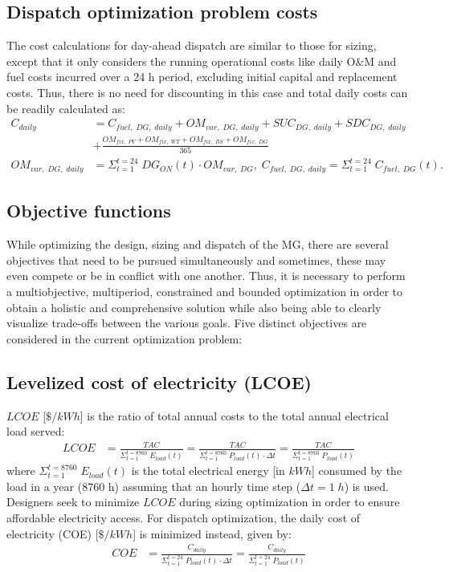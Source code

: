 \documentclass[final,3p,times]{elsarticle}
\begin{document}
\subsection{Dispatch optimization problem costs}

The cost calculations for day-ahead dispatch are similar to those for sizing, except that it only considers the running operational costs like daily O\&M and fuel costs incurred over a 24 h period, excluding initial capital and replacement costs. Thus, there is no need for discounting in this case and total daily costs can be readily calculated as: 
\begin{align*}
    C_{daily} & = C_{fuel,\; DG,\; daily} + OM_{var, \; DG,\; daily} + SUC_{DG,\;daily} + SDC_{DG,\;daily} \\
    & + \frac{OM_{fix,\;PV} + OM_{fix,\;WT} + OM_{fix,\;BS} + OM_{fix,\;DG}}{365} \\
    OM_{var, \; DG,\; daily} & = \Sigma_{t=1}^{t=24} \; DG_{ON}(t) \cdot OM_{var, \; DG}, \; C_{fuel,\; DG,\; daily} = \Sigma_{t=1}^{t=24} \; C_{fuel,\; DG}(t). 
\end{align*}

\subsection{Objective functions}

While optimizing the design, sizing and dispatch of the MG, there are several objectives that need to be pursued simultaneously and sometimes, these may even compete or be in conflict with one another. Thus, it is necessary to perform a multiobjective, multiperiod, constrained and bounded optimization in order to obtain a holistic and comprehensive solution while also being able to clearly visualize trade-offs between the various goals. Five distinct objectives are considered in the current optimization problem:

\subsection{Levelized cost of electricity (LCOE)}
$LCOE$ [$\$/kWh$] is the ratio of total annual costs to the total annual electrical load served:
\begin{align}
    LCOE & = \frac{TAC}{\Sigma_{t=1}^{t=8760} \; E_{load}(t)} = \frac{TAC}{\Sigma_{t=1}^{t=8760} \; P_{load}(t)\cdot \Delta t} = \frac{TAC}{\Sigma_{t=1}^{t=8760} \; P_{load}(t)}
\end{align}
where $\Sigma_{t=1}^{t=8760} \; E_{load}(t)$ is the total electrical energy [in $kWh$] consumed by the load in a year (8760 h) assuming that an hourly time step ($\Delta t = 1 \; h$) is used. Designers seek to minimize $LCOE$ during sizing optimization in order to ensure affordable electricity access. For dispatch optimization, the daily cost of electricity (COE) [$\$/kWh$] is minimized instead, given by:
\begin{align*}
    COE & = \frac{C_{daily}}{\Sigma_{t=1}^{t=24} \; P_{load} (t)\cdot \Delta t}  = \frac{C_{daily}}{\Sigma_{t=1}^{t=24} \; P_{load}(t)}
\end{align*}
\end{document}
